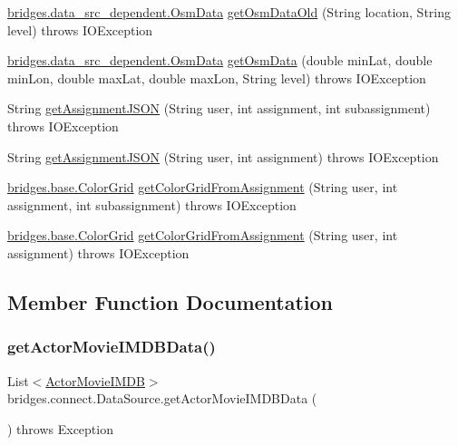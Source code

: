 \begin{DoxyCompactItemize}
\item 
\mbox{\hyperlink{classbridges_1_1data__src__dependent_1_1_osm_data}{bridges.\+data\+\_\+src\+\_\+dependent.\+Osm\+Data}} \mbox{\hyperlink{classbridges_1_1connect_1_1_data_source_aa6e921802c9cee6b7f87fe66f48bfec7}{get\+Osm\+Data\+Old}} (String location, String level)  throws I\+O\+Exception 
\item 
\mbox{\hyperlink{classbridges_1_1data__src__dependent_1_1_osm_data}{bridges.\+data\+\_\+src\+\_\+dependent.\+Osm\+Data}} \mbox{\hyperlink{classbridges_1_1connect_1_1_data_source_af68a95ea0608f5bcf0be9e336f748d76}{get\+Osm\+Data}} (double min\+Lat, double min\+Lon, double max\+Lat, double max\+Lon, String level)  throws I\+O\+Exception 
\item 
String \mbox{\hyperlink{classbridges_1_1connect_1_1_data_source_af2f6cd7172acb64b2ba49f134b5391f8}{get\+Assignment\+J\+S\+ON}} (String user, int assignment, int subassignment)  throws I\+O\+Exception 
\item 
String \mbox{\hyperlink{classbridges_1_1connect_1_1_data_source_af55c85da71b588f64ff4b46dbacab7f4}{get\+Assignment\+J\+S\+ON}} (String user, int assignment)  throws I\+O\+Exception 
\item 
\mbox{\hyperlink{classbridges_1_1base_1_1_color_grid}{bridges.\+base.\+Color\+Grid}} \mbox{\hyperlink{classbridges_1_1connect_1_1_data_source_a9556950d89b39ce61bead0879d1e2192}{get\+Color\+Grid\+From\+Assignment}} (String user, int assignment, int subassignment)  throws I\+O\+Exception 
\item 
\mbox{\hyperlink{classbridges_1_1base_1_1_color_grid}{bridges.\+base.\+Color\+Grid}} \mbox{\hyperlink{classbridges_1_1connect_1_1_data_source_ab715453b17503c73075f653326c09f44}{get\+Color\+Grid\+From\+Assignment}} (String user, int assignment)  throws I\+O\+Exception 
\end{DoxyCompactItemize}


\subsection{Member Function Documentation}
\mbox{\label{classbridges_1_1connect_1_1_data_source_aaaef8df40e95d5370a7f172c301d2d9f}} 
\subsubsection{\texorpdfstring{getActorMovieIMDBData()}{getActorMovieIMDBData()}\hspace{0.1cm}{\footnotesize\ttfamily [1/2]}}
{\footnotesize\ttfamily List$<$\mbox{\hyperlink{classbridges_1_1data__src__dependent_1_1_actor_movie_i_m_d_b}{Actor\+Movie\+I\+M\+DB}}$>$ bridges.\+connect.\+Data\+Source.\+get\+Actor\+Movie\+I\+M\+D\+B\+Data (\begin{DoxyParamCaption}{ }\end{DoxyParamCaption}) throws Exception}

